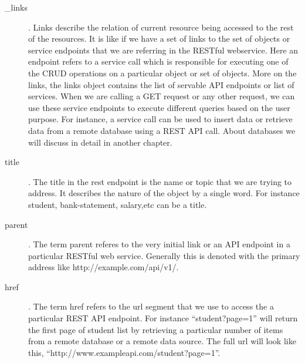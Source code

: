 \begin{description} 

\item [\_links]. Links describe the relation of current resource being
  accessed to the rest of the resources. It is like if we have a set
  of links to the set of objects or service endpoints that we are
  referring in the RESTful webservice. Here an endpoint refers to a
  service call which is responsible for executing one of the CRUD
  operations on a particular object or set of objects. More on the
  links, the links object contains the list of servable API endpoints
  or list of services.  When we are calling a GET request or any other
  request, we can use these service endpoints to execute different
  queries based on the user purpose.  For instance, a service call can
  be used to insert data or retrieve data from a remote database using
  a REST API call. About databases we will discuss in detail in another
  chapter.

\item [title]. The title in the rest endpoint is the name or topic
  that we are trying to address. It describes the nature of the object
  by a single word. For instance student, bank-statement, salary,etc
  can be a title.

\item [parent]. The term parent referes to the very initial link or an
  API endpoint in a particular RESTful web service. Generally this is
  denoted with the primary address like http://example.com/api/v1/.

\item [href]. The term href refers to the url segment that we use to
  access the a particular REST API endpoint. For instance
  ``student?page=1'' will return the first page of student list by
  retrieving a particular number of items from a remote database or a
  remote data source. The full url will look like this,
  ``http://www.exampleapi.com/student?page=1''.

\end{description}  

\begin{comment}
\subsection{Rendering Data in UI}

\TODO{seems incomplete}

In this section, we are talking about the way of using HATEOAS
practically in user interface development in web applications.

\begin{lstlisting}
  <resource>
  <link rel='child' href='student' title='student'/>
  </resource>
\end{lstlisting}

This is the practical representation of the HATEOAS in real world
applications.
\end{comment}




